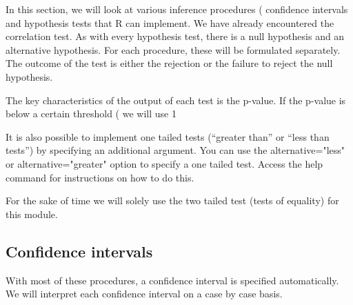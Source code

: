 \documentclass[a4paper,12pt]{article}
\begin{document}
\tableofcontents


In this section, we will look at various inference procedures ( confidence intervals and hypothesis tests that R can implement. We have already encountered the correlation test. 
As with every hypothesis test, there is a null hypothesis and an alternative hypothesis.
For each procedure, these will be formulated separately. The outcome of the test is either the rejection or the failure to reject the null hypothesis.

The key characteristics of the output of each test is the p-value. If the p-value is below a certain threshold ( we will use 1%

It is also possible to implement one tailed tests (“greater than” or “less than tests”) by specifying an additional argument. You can use the alternative="less" or alternative="greater" option to specify a one tailed test. Access the help command for instructions on how to do this. 

For the sake of time we will solely use the two tailed test (tests of equality) for this 
module.

\subsection{Confidence intervals}
With most of these procedures, a confidence interval is specified automatically. We will interpret each confidence interval on a case by case basis.
\end{document}

